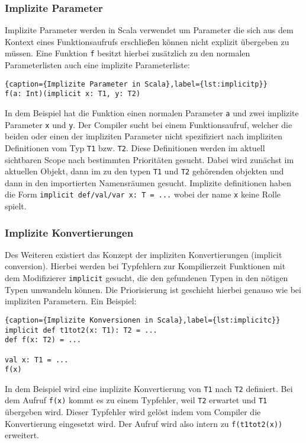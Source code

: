 \subsubsection{Implizite Parameter}

Implizite Parameter werden in Scala verwendet um Parameter die sich aus dem  Kontext eines
Funktionsaufrufs erschließen können nicht explizit übergeben zu müssen. Eine Funktion \texttt{f}
besitzt hierbei zusätzlich zu den normalen  Parameterlisten auch eine implizite Parameterliste:

\begin{lstlisting}{caption={Implizite Parameter in Scala},label={lst:implicitp}}
f(a: Int)(implicit x: T1, y: T2)
\end{lstlisting}

In dem Beispiel hat die Funktion einen normalen Parameter \texttt{a} und zwei  implizite Parameter
\texttt{x} und \texttt{y}. Der Compiler sucht bei einem  Funktionsaufruf, welcher die beiden oder
einen der impliziten Parameter nicht  spezifiziert nach impliziten Definitionen vom Typ \texttt{T1}
bzw. \texttt{T2}.  Diese Definitionen werden im aktuell sichtbaren Scope nach bestimmten
Prioritäten gesucht. Dabei wird zunächst im aktuellen Objekt, dann im zu den  typen \texttt{T1} und
\texttt{T2} gehörenden objekten und dann in den  importierten Namensräumen gesucht. Implizite
definitionen haben die Form  \texttt{implicit def/val/var x: T = ...} wobei der name \texttt{x}
keine Rolle  spielt.

\subsubsection{Implizite Konvertierungen}

Des Weiteren existiert das Konzept der impliziten Konvertierungen (implicit conversion). Hierbei
werden bei  Typfehlern zur Kompilierzeit Funktionen mit dem Modifizierer \texttt{implicit}  gesucht,
die den gefundenen Typen in den nötigen Typen umwandeln können.  Die Priorisierung ist geschieht
hierbei genauso wie bei impliziten Parametern. Ein Beispiel:

\begin{lstlisting}{caption={Implizite Konversionen in Scala},label={lst:implicitc}}
implicit def t1tot2(x: T1): T2 = ...
def f(x: T2) = ...

val x: T1 = ...
f(x)
\end{lstlisting}

In dem Beispiel wird eine implizite Konvertierung von \texttt{T1} nach \texttt{T2}  definiert. Bei
dem Aufruf \texttt{f(x)} kommt es zu einem Typfehler, weil  \texttt{T2} erwartet und \texttt{T1}
übergeben wird. Dieser Typfehler wird  gelöst indem vom Compiler die Konvertierung eingesetzt wird.
Der Aufruf wird also intern zu \texttt{f(t1tot2(x))} erweitert.

